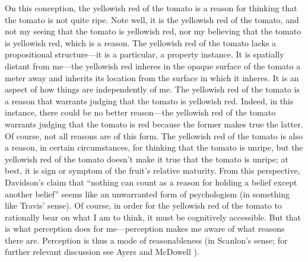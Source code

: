 \documentclass[12pt]{article}
\begin{document}
On this conception, the yellowish red of the tomato is a reason for thinking that the tomato is not quite ripe. Note well, it is the yellowish red of the tomato, and not my seeing that the tomato is yellowish red, nor my believing that the tomato is yellowish red, which is a reason. The yellowish red of the tomato lacks a propositional structure---it is a particular, a property instance. It is spatially distant from me---the yellowish red inheres in the opaque surface of the tomato a meter away and inherits its location from the surface in which it inheres. It is an aspect of how things are independently of me. The yellowish red of the tomato is a reason that warrants judging that the tomato is yellowish red. Indeed, in this instance, there could be no better reason---the yellowish red of the tomato warrants judging that the tomato is red because the former makes true the latter. Of course, not all reasons are of this form. The yellowish red of the tomato is also a reason, in certain circumstances, for thinking that the tomato is unripe, but the yellowish red of the tomato doesn't make it true that the tomato is unripe; at best, it is sign or symptom of the fruit's relative maturity. From this perspective, Davidson's \citeyearpar[310]{Davidson:1986uq} claim that ``nothing can count as a reason for holding a belief except another belief'' seems like an unwarranted form of psychologism (in something like Travis' \citeyear{Travis:2006fk} sense). Of course, in order for the yellowish red of the tomato to rationally bear on what I am to think, it must be cognitively accessible. But that is what perception does for me---perception makes me aware of what reasons there are. Perception is thus a mode of reasonableness (in Scanlon's \citeyear[]{Scanlon:1998hb} sense; for further relevant discussion see Ayers \citeyear{Ayers:2004kx} and McDowell \citeyear{McDowell:2006vn}).
\end{document}
